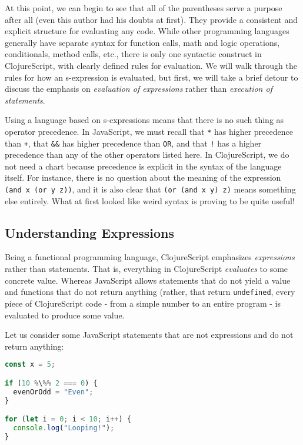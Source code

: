 \documentclass[10pt,twoside,openright]{memoir}
\begin{document}
At this point, we can begin to see that all of the parentheses serve a
purpose after all (even this author had his doubts at first). They
provide a consistent and explicit structure for evaluating any code.
While other programming languages generally have separate syntax for
function calls, math and logic operations, conditionals, method calls,
etc., there is only one syntactic construct in ClojureScript, with
clearly defined rules for evaluation. We will walk through the rules for
how an s-expression is evaluated, but first, we will take a brief detour
to discuss the emphasis on \emph{evaluation of expressions} rather than
\emph{execution of statements}.

\begin{notice}[title={Note}]
Using a language based on s-expressions means that there is no such
thing as operator precedence. In JavaScript, we must recall that
\texttt{*} has higher precedence than \texttt{+}, that \texttt{\&\&} has
higher precedence than \texttt{OR}, and that \texttt{!} has a higher
precedence than any of the other operators listed here. In
ClojureScript, we do not need a chart because precedence is explicit in
the syntax of the language itself. For instance, there is no question
about the meaning of the expression \texttt{(and\ x\ (or\ y\ z))}, and
it is also clear that \texttt{(or\ (and\ x\ y)\ z)} means something else
entirely. What at first looked like weird syntax is proving to be quite
useful!
\end{notice}

\subsection{Understanding Expressions}

Being a functional programming language, ClojureScript emphasizes
\emph{expressions} rather than statements. That is, everything in
ClojureScript \emph{evaluates} to some concrete value. Whereas
JavaScript allows statements that do not yield a value and functions
that do not return anything (rather, that return \texttt{undefined},
every piece of ClojureScript code - from a simple number to an entire
program - is evaluated to produce some value.

Let us consider some JavaScript statements that are not expressions and
do not return anything:

\begin{lstlisting}[language=JavaScript, caption={JavaScript Statements}]
const x = 5;

if (10 %\%% 2 === 0) {
  evenOrOdd = "Even";
}

for (let i = 0; i < 10; i++) {
  console.log("Looping!");
}
\end{lstlisting}
\end{document}
